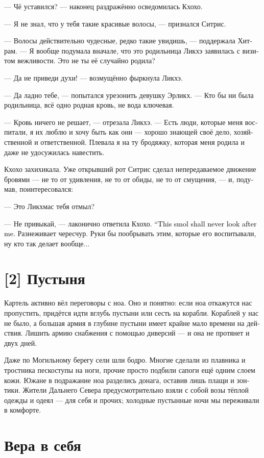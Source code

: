\documentclass[a4paper,12pt,fleqn]{book}\usepackage{cooltooltips}\usepackage{polyglossia}\setdefaultlanguage[babelshorthands=true]{russian}\setotherlanguage{english}\defaultfontfeatures{Ligatures=TeX,Mapping=tex-text} \usepackage{xcolor}\definecolor{lightgray}{HTML}{bbbbbb}\color{lightgray}\newcommand{\ml}[3]{\textenglish{\textcolor{black}{#3}}}
\begin{document}
{--- Чё уставился? --- наконец раздражённо осведомилась Кхохо.

--- Я не знал, что у тебя такие красивые волосы, --- признался Ситрис.

--- Волосы действительно чудесные, редко такие увидишь, --- поддержала Хитрам.
--- Я вообще подумала вначале, что это родильница Ликхэ заявилась с визитом вежливости.
Это не ты её случайно родила?

--- Да не приведи духи! --- возмущённо фыркнула Ликхэ.

--- Да ладно тебе, --- попытался урезонить девушку Эрликх.
--- Кто бы ни была родильница, всё одно родная кровь, не вода ключевая.

--- Кровь ничего не решает, --- отрезала Ликхэ.
--- Есть люди, которые меня воспитали, я их люблю и хочу быть как они --- хорошо знающей своё дело, хозяйственной и ответственной.
Плевала я на ту бродяжку, которая меня родила и даже не удосужилась навестить.

Кхохо захихикала.
Уже открывший рот Ситрис сделал непередаваемое движение бровями --- не то от удивления, не то от обиды, не то от смущения, --- и, подумав, поинтересовался:

--- Это Ликхмас тебя отмыл?

--- Не привыкай, --- лаконично ответила Кхохо.
\ml{$0$}
{--- Больше эта мелочь со мной сидеть не будет.}
{``This smol shall never look after me.}
Разнеживает чересчур.
Руки бы пообрывать этим, которые его воспитывали, ну кто так делает вообще...

\section{[2] Пустыня}

Картель активно вёл переговоры с ноа.
Оно и понятно: если ноа откажутся нас пропустить, придётся идти вглубь пустыни или сесть на корабли.
Кораблей у нас не было, а большая армия в глубине пустыни имеет крайне мало времени на действия.
Лишить армию снабжения с помощью диверсий --- и она не протянет и двух дней.

Даже по Могильному берегу сели шли бодро.
Многие сделали из плавника и тростника пескоступы на ноги, прочие просто подбили сапоги ещё одним слоем кожи.
Южане в подражание ноа разделись донага, оставив лишь плащи и зонтики.
Жители Дальнего Севера предусмотрительно взяли с собой возы тёплой одежды и одеял --- для себя и прочих;
холодные пустынные ночи мы переживали в комфорте.

\section{Вера в себя}

}
\end{document}
